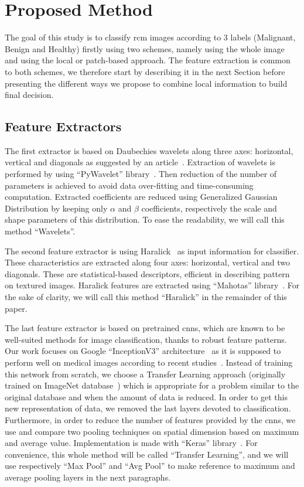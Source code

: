 \section{Proposed Method}
\label{methods}
The goal of this study is to classify \ac{rcm} images according to 3 labels (Malignant, Benign and Healthy) firstly using two schemes, namely using the whole image and using the local or patch-based approach. The feature extraction is common to both schemes, we therefore start by describing it in the next Section before presenting the different ways we propose to combine local information to build final decision.\par

\subsection{Feature Extractors}
\label{descriptors}
The first extractor is based on Daubechies wavelets along three axes: horizontal, vertical and diagonals as suggested by an article~\cite{Halimi2017a}. Extraction of wavelets is performed by using “PyWavelet” library~\cite{lee2006pywavelets}. Then reduction of the number of parameters is achieved to avoid data over-fitting and time-consuming computation. Extracted coefficients are reduced using Generalized Gaussian Distribution by keeping only $\alpha$ and $\beta$ coefficients, respectively the scale and shape parameters of this distribution. To ease the readability, we will call this method “Wavelets”.\par
The second feature extractor is using Haralick~\cite{Haralick1973} as input information for classifier. These characteristics are extracted along four axes: horizontal, vertical and two diagonals. These are statistical-based descriptors, efficient in describing pattern on textured images. Haralick features are extracted using “Mahotas” library~\cite{coelho2012mahotas}. For the sake of clarity, we will call this method “Haralick” in the remainder of this paper.\par
The last feature extractor is based on pretrained \acsp{cnn}, which are known to be well-suited methods for image classification, thanks to robust feature patterns. Our work focuses on Google “InceptionV3” architecture~\cite{Szegedy2015} as it is supposed to perform well on medical images according to recent studies~\cite{Litjens2017}. Instead of training this network from scratch, we choose a Transfer Learning approach (originally trained on ImageNet database~\cite{Deng2008}) which is appropriate for a problem similar to the original database and when the amount of data is reduced. In order to get this new representation of data, we removed the last layers devoted to classification. Furthermore, in order to reduce the number of features provided by the \acsp{cnn}, we use and compare two pooling techniques on spatial dimension based on maximum and average value. Implementation is made with “Keras” library~\cite{chollet2015keras}. For convenience, this whole method will be called “Transfer Learning”, and we will use respectively “Max Pool” and “Avg Pool” to make reference to maximum and average pooling layers in the next paragraphs.\par

